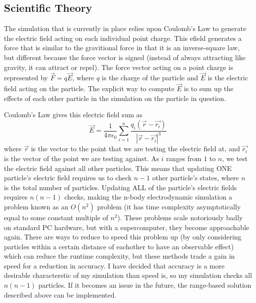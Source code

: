 \documentclass[10pt]{article}
\begin{document}
\clearpage
\subsection{Scientific Theory}
The simulation that is currently in place relies upon Coulomb's Law to generate the electric field acting on each individual point charge. This efield generates a force that is similar to the gravitional force in that it is an inverse-square law, but different because the force vector is signed (instead of always attracting like gravity, it can attract or repel). The force vector acting on a point charge is represented by $\vec{F} = q\vec{E}$, where $q$ is the charge of the particle and $\vec{E}$ is the electric field acting on the particle. The explicit way to compute $\vec{E}$ is to sum up the effects of each other particle in the simulation on the particle in question.

Coulomb's Law gives this electric field sum as $$\vec{E} = \frac{1}{4\pi\epsilon_0}\sum_{i = 1}^n \frac{q_i (\vec{r} - \vec{r_i})}{|\vec{r} - \vec{r_i}|^3}$$ where $\vec{r}$ is the vector to the point that we are testing the electric field at, and $\vec{r_i}$ is the vector of the point we are testing against. As $i$ ranges from $1$ to $n$, we test the electric field against all other particles. This means that updating ONE particle's electric field requires us to check $n-1$ other particle's states, where $n$ is the total number of particles. Updating ALL of the particle's electric fields requires $n(n-1)$ checks, making the n-body electrodynamic simulation a problem known as an $O(n^2)$ problem (it has time complexity asymptotically equal to some constant multiple of $n^2$). These problems scale notoriously badly on standard PC hardware, but with a supercomputer, they become approachable again. There are ways to reduce to speed this problem up (by only considering particles within a certain distance of eachother to have an observable effect) which can reduce the runtime complexity, but these methods trade a gain in speed for a reduction in accuracy. I have decided that accuracy is a more desirable characterstic of my simulation than speed is, so my simulation checks all $n(n-1)$ particles. If it becomes an issue in the future, the range-based solution described above can be implemented.
\end{document}
